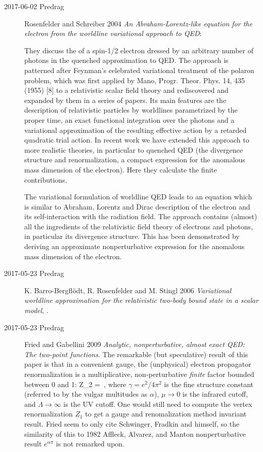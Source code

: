 \begin{description}
\item[2017-06-02 Predrag]
Rosenfelder and Schreiber 2004
{\em An {Abraham-Lorentz-}like equation for the electron from the
worldline variational approach to {QED}}:

They discuss the of a spin-1/2 electron dressed by an arbitrary number of
photons in the quenched approximation to QED. The approach is patterned
after Feynman’s celebrated variational treatment of the polaron
problem, which was first applied by Mano, Progr. Theor.
Phys. 14, 435 (1955) [8] to a relativistic  scalar  field  theory  and
rediscovered  and  expanded by them in a series of
papers. Its main features are the description of
relativistic particles by worldlines parametrized by the
proper time, an exact functional integration over the photons and a
variational approximation of the resulting effective action by a retarded
quadratic trial action. In recent work we have extended this approach to
more realistic theories, in particular to quenched QED (the
divergence structure and renormalization, a compact expression for the
anomalous mass dimension of the electron). Here they calculate the finite
contributions.

The variational formulation of worldline QED leads to an equation which
is similar to Abraham, Lorentz and Dirac description of the electron and
its self-interaction with the radiation field. The approach contains
(almost) all the ingredients of the relativistic field theory of
electrons and photons, in particular its divergence structure. This has
been demonstrated by deriving an approximate nonperturbative expression
for the anomalous mass dimension of the electron.

\item[2017-05-23 Predrag]
K. Barro-Bergfl\"odt, R. Rosenfelder and M. Stingl 2006 {\em
Variational worldline approximation for the relativistic two-body bound
state in a scalar model}, .

\item[2017-05-23 Predrag]
Fried and Gabellini 2009
{\em Analytic, nonperturbative, almost exact {QED: The} two-point functions}.
The remarkable (but speculative) result of this paper is that in a
convenient gauge, the (unphysical) electron propagator renormalization is
a multiplicative, non-perturbative \emph{finite} factor bounded between 0
and 1:
\beq
Z_2 = \exp{}
\,,
where $\gamma = e^2/4\pi^2$ is the fine structure constant (referred to
by the vulgar multitudes as $\alpha$), $\mu\to 0$ is the infrared cutoff,
and $\Lambda\to\infty$ is the UV cutoff. One would still need to compute
the vertex renormalization $Z_1$ to get a gauge and renomalization method
invariant result. Fried seem to only cite Schwinger, Fradkin and himself,
so the similarity of this to 1982 Affleck, Alvarez, and
Manton nonperturbative result $e^{\alpha\pi}$ is not
remarked upon.


\end{description}
